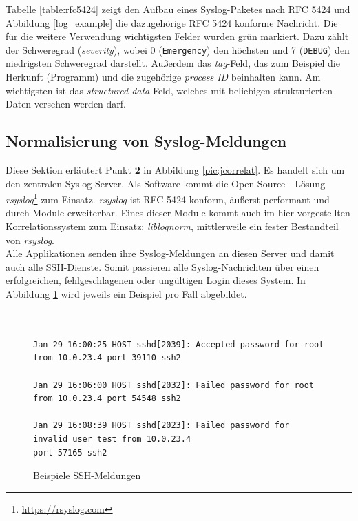 Tabelle \ref{table:rfc5424} zeigt den Aufbau eines Syslog-Paketes nach RFC 5424 und 
Abbildung \ref{log_example} die dazugehörige RFC 5424 konforme Nachricht. Die für 
die weitere Verwendung wichtigsten Felder wurden grün markiert. Dazu zählt der 
Schweregrad (\textit{severity}), wobei 0 (\texttt{Emergency}) den höchsten und 7 
(\texttt{DEBUG}) den niedrigsten Schweregrad darstellt. Außerdem das \textit{tag}-Feld, 
das zum Beispiel die Herkunft (Programm) und die zugehörige \textit{process ID} 
beinhalten kann. 
Am wichtigsten ist das \textit{structured data}-Feld, welches mit beliebigen 
strukturierten Daten versehen werden darf.

\subsection{Normalisierung von Syslog-Meldungen}\label{syslog-konsolidierung}

Diese Sektion erläutert Punkt \textbf{2} in Abbildung \ref{pic:jcorrelat}. Es handelt 
sich um den zentralen Syslog-Server. Als Software kommt die Open Source - Lösung 
\textit{rsyslog}\footnote{\url{https://rsyslog.com}} zum Einsatz. \textit{rsyslog} ist 
RFC 5424 konform, äußerst performant und durch Module erweiterbar. Eines dieser 
Module kommt auch im hier vorgestellten Korrelationssystem zum Einsatz: 
\textit{liblognorm}, mittlerweile ein fester Bestandteil von \textit{rsyslog}.\\ 

Alle Applikationen senden ihre Syslog-Meldungen an diesen Server und damit auch alle 
SSH-Dienste. Somit passieren alle Syslog-Nachrichten über einen erfolgreichen, 
fehlgeschlagenen oder ungültigen Login dieses System. In Abbildung \ref{ssh_example} wird 
jeweils ein Beispiel pro Fall abgebildet.

\begin{figure}[h]
    \caption{Beispiele SSH-Meldungen}
    \label{ssh_example}\vspace{0.2cm}
    \centering
    \begin{shaded*}
    \small{      
        \begin{verbatim}        


Jan 29 16:00:25 HOST sshd[2039]: Accepted password for root from 10.0.23.4 port 39110 ssh2
        
Jan 29 16:06:00 HOST sshd[2032]: Failed password for root from 10.0.23.4 port 54548 ssh2

Jan 29 16:08:39 HOST sshd[2023]: Failed password for invalid user test from 10.0.23.4 
port 57165 ssh2
\end{verbatim}}
\end{shaded*}
\end{figure}


